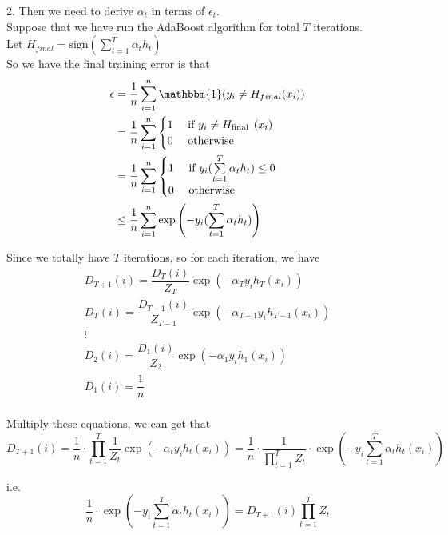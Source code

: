 \documentclass[10pt]{article}
\begin{document}
\begin{enumerate}[1.]
2. Then we need to derive $\alpha_t$ in terms of $\epsilon_t$.\\
Suppose that we have run the AdaBoost algorithm for total $T$ iterations.\\
Let $H_{final}=\text{sign}(\sum\limits_{t=1}^T\alpha_th_t)$\\
So we have the final training error is that\\
\begin{equation}
\begin{aligned}
\epsilon &=\dfrac{1}{n}\sum_{i=1}^n\mathbbm{1}(y_i\neq H_{final}(x_i))\\
& =\frac{1}{n} \sum_{i=1}^n \begin{cases}1 & \text { if } y_i \neq H_{\text {final }}\left(x_i\right) \\
0 & \text { otherwise }\end{cases} \\
& =\frac{1}{n} \sum_{i=1}^n \begin{cases}1 & \text { if } y_i (\sum\limits_{t=1}^T\alpha_th_t) \leq 0 \\
0 & \text { otherwise }\end{cases} \\
& \leq \frac{1}{n} \sum_{i=1}^n \exp \left(-y_i (\sum\limits_{t=1}^T\alpha_th_t)\right) \\
\end{aligned}
\end{equation}

Since we totally have $T$ iterations, so for each iteration, we have
\begin{align*}
    D_{T+1}(i)=\dfrac{D_{T}(i)}{Z_T}\exp(-\alpha_{T}y_ih_{T}(x_i))\\
    D_{T}(i)=\dfrac{D_{T-1}(i)}{Z_{T-1}}\exp(-\alpha_{T-1}y_ih_{T-1}(x_i))\\
    \vdots\\
    D_2(i)=\dfrac{D_1(i)}{Z_2}\exp(-\alpha_1y_ih_1(x_i))\\
    D_1(i)=\dfrac{1}{n}\\
\end{align*} 

Multiply these equations, we can get that
$$D_{T+1}(i)=\dfrac{1}{n}\cdot \prod_{t=1}^{T}\dfrac{1}{Z_t}\exp(-\alpha_ty_ih_t(x_i))=\dfrac{1}{n}\cdot \dfrac{1}{\prod\limits_{t=1}^{T}Z_t}\cdot \exp\left(-y_i\sum_{t=1}^{T}\alpha_th_t(x_i)\right)$$

i.e.
\begin{equation}
\dfrac{1}{n}\cdot \exp\left(-y_i\sum_{t=1}^{T}\alpha_th_t(x_i)\right)=D_{T+1}(i)\prod_{t=1}^{T}Z_t
\end{equation}


\end{enumerate}
\end{document}
